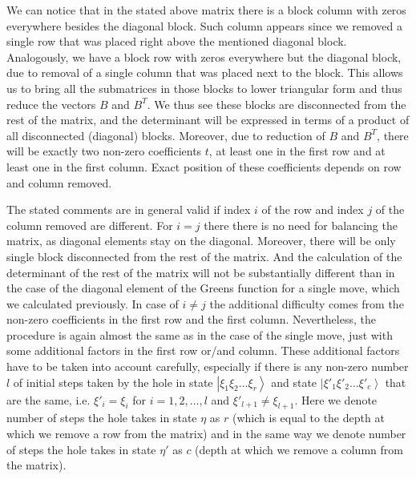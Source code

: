 \documentclass{article}
\newcommand{\ket}[1]{\left\vert #1 \right\rangle}
\begin{document}
We can notice that in the stated above matrix there is a block column with zeros everywhere besides the diagonal block. Such column appears since we removed a single row that was placed right above the mentioned diagonal block. Analogously, we have a block row with zeros everywhere but the diagonal block, due to removal of a single column that was placed next to the block. This allows us to bring all the submatrices in those blocks to lower triangular form and thus reduce the vectors $B$ and $B^T$. We thus see these blocks are disconnected from the rest of the matrix, and the determinant will be expressed in terms of a product of all disconnected (diagonal) blocks. Moreover, due to reduction of $B$ and $B^T$, there will be exactly two non-zero coefficients $t$, at least one in the first row and at least one in the first column. Exact position of these coefficients depends on row and column removed. 

The stated comments are in general valid if index $i$ of the row and index $j$ of the column removed are different. For $i=j$ there there is no need for balancing the matrix, as diagonal elements stay on the diagonal. Moreover, there will be only single block disconnected from the rest of the matrix. And the calculation of the determinant of the rest of the matrix will not be substantially different than in the case of the diagonal element of the Greens function for a single move, which we calculated previously. In case of $i \neq j$ the additional difficulty comes from the non-zero coefficients in the first row and the first column. Nevertheless, the procedure is again almost the same as in the case of the single move, just with some additional factors in the first row or/and column. These additional factors have to be taken into account carefully, especially if there is any non-zero number $l$ of initial steps taken by the hole in state $\ket{\xi_1 \xi_2 \hdots \xi_r}$ and state $\ket{\xi'_1 \xi'_2 \hdots \xi'_c}$ that are the same, i.e. $\xi'_i = \xi_i$ for $i = 1,2,\hdots,l$ and  $\xi'_{l+1} \neq \xi_{l+1}$. Here we denote number of steps the hole takes in state $\eta$ as $r$ (which is equal to the depth at which we remove a row from the matrix) and in the same way we denote number of steps the hole takes in state $\eta'$ as $c$ (depth at which we remove a column from the matrix).
\end{document}
